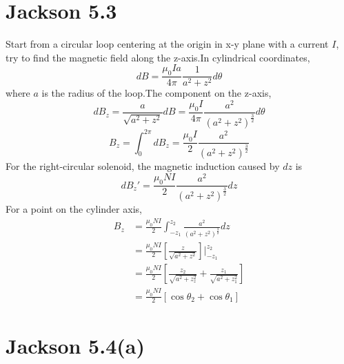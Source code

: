 \documentclass{article}
\begin{document}
\section*{Jackson 5.3}

Start from a circular loop centering at the origin in x-y plane with a current $I$, try to find the magnetic field along the z-axis.In cylindrical coordinates,
\[ dB=\frac{\mu_0Ia}{4\pi}\frac{1}{a^2+z^2}d\theta \]
where $a$ is the radius of the loop.The component on the z-axis,
\[ dB_z=\frac{a}{\sqrt{a^2+z^2}}dB=\frac{\mu_0I}{4\pi}\frac{a^2}{(a^2+z^2)^{\frac 32}}d\theta \]
\[ B_z=\int_0^{2\pi}dB_z=\frac{\mu_0I}{2}\frac{a^2}{(a^2+z^2)^{\frac 32}} \]
For the right-circular solenoid, the magnetic induction caused by $dz$ is
\[ dB_z'=\frac{\mu_0NI}{2}\frac{a^2}{(a^2+z^2)^{\frac 32}}dz \]
For a point on the cylinder axis,
\begin{align*}
  B_z&=\frac{\mu_0NI}{2}\int_{-z_1}^{z_2}\frac{a^2}{(a^2+z^2)^{\frac 32}}dz\\
  &=\frac{\mu_0NI}{2}[\frac{z}{\sqrt{a^2+z^2}}]|^{z_2}_{-z_1}\\
  &=\frac{\mu_0NI}{2}[\frac{z_2}{\sqrt{a^2+z_z^2}}+\frac{z_1}{\sqrt{a^2+z_1^2}}]\\
     &=\frac{\mu_0NI}{2}[\cos\theta_2+\cos\theta_1]
\end{align*}
\pagebreak

\section*{Jackson 5.4(a)}
\end{document}
